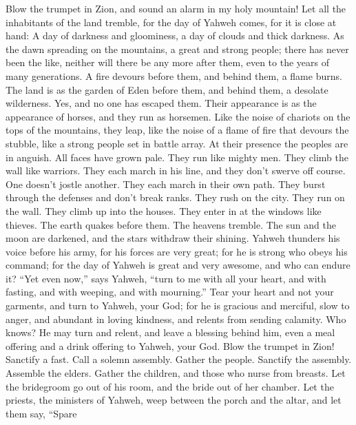  Blow the trumpet in Zion, and sound an alarm in my holy
mountain! Let all the inhabitants of the land tremble, for the day of
Yahweh comes, for it is close at hand:  A day of darkness
and gloominess, a day of clouds and thick darkness. As the dawn
spreading on the mountains, a great and strong people; there has never
been the like, neither will there be any more after them, even to the
years of many generations.  A fire devours before them,
and behind them, a flame burns. The land is as the garden of Eden before
them, and behind them, a desolate wilderness. Yes, and no one has
escaped them.  Their appearance is as the appearance of
horses, and they run as horsemen.  Like the noise of
chariots on the tops of the mountains, they leap, like the noise of a
flame of fire that devours the stubble, like a strong people set in
battle array.  At their presence the peoples are in
anguish. All faces have grown pale.  They run like mighty
men. They climb the wall like warriors. They each march in his line, and
they don't swerve off course.  One doesn't jostle another.
They each march in their own path. They burst through the defenses and
don't break ranks.  They rush on the city. They run on the
wall. They climb up into the houses. They enter in at the windows like
thieves.  The earth quakes before them. The heavens
tremble. The sun and the moon are darkened, and the stars withdraw their
shining.  Yahweh thunders his voice before his army, for
his forces are very great; for he is strong who obeys his command; for
the day of Yahweh is great and very awesome, and who can endure it?
 ``Yet even now,'' says Yahweh, ``turn to me with all
your heart, and with fasting, and with weeping, and with mourning.''
 Tear your heart and not your garments, and turn to
Yahweh, your God; for he is gracious and merciful, slow to anger, and
abundant in loving kindness, and relents from sending calamity.
 Who knows? He may turn and relent, and leave a blessing
behind him, even a meal offering and a drink offering to Yahweh, your
God.  Blow the trumpet in Zion! Sanctify a fast. Call a
solemn assembly.  Gather the people. Sanctify the
assembly. Assemble the elders. Gather the children, and those who nurse
from breasts. Let the bridegroom go out of his room, and the bride out
of her chamber.  Let the priests, the ministers of
Yahweh, weep between the porch and the altar, and let them say, ``Spare
